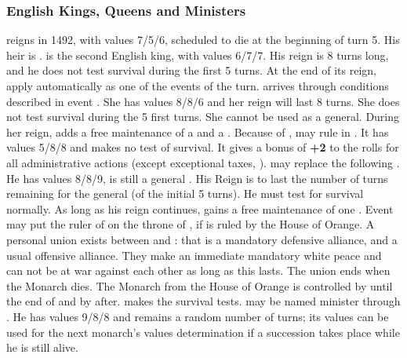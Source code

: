 \subsubsection{English Kings, Queens and Ministers}
 reigns in 1492, with values 7/5/6,
scheduled to die at the beginning of turn 5. His heir is .
 is the second English king, with
values 6/7/7. His reign is 8 turns long, and he does not test survival
during the first 5 turns. At the end of its reign, apply automatically
 as one of the events of the turn.
 arrives through conditions
described in event . She has values 8/8/6
and her reign will last 8 turns. She does not test survival during the 5
first turns. She cannot be used as a general. During her reign, \ENG
adds a free maintenance of a \FLEET\faceplus and a \corsaire\faceplus.
 Because of
,  may rule in
\ENG. It has values 5/8/8 and makes no test of survival. It gives a
bonus of {\bf +2} to the rolls for all administrative actions (except
exceptional taxes, ).
 may replace the 
following . He has values 8/8/9, is
still a general .  His Reign is to last the number
of turns remaining for the general (of the initial 5 turns).  He must
test for survival normally. As long as his reign continues, \ENG gains a
free maintenance of one \ARMY\faceplus.
 Event
 may put the ruler of \HOL on the
throne of \ENG, if \HOL is ruled by the House of Orange.
\bparag A personal union exists between \HOL and \ENG: that is a
mandatory defensive alliance, and a usual offensive alliance. They make
an immediate mandatory white peace and can not be at war against each
other as long as this lasts. The union ends when the Monarch dies.
\bparag The Monarch from the House of Orange is controlled by \ANG until
the end of  and by \HOL after. \HOL
makes the survival tests.
 may be named minister through
. He has values 9/8/8 and remains a random
number of turns; its values can be used for the next monarch's values
determination if a succession takes place while he is still alive.

